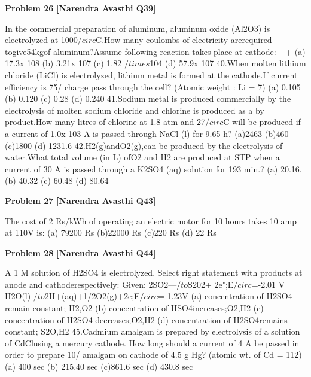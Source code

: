 \begin{problembox}
\textbf{Problem 26} \hfill \textbf{[Narendra Avasthi Q39]}
\label{q:ext-narendra_avasthi_all_questions-26}

In the commercial preparation of aluminum, aluminum oxide (Al2O3) is electrolyzed at
1000$/circ$C.How many coulombs of electricity arerequired togive54kgof aluminum?Assume
following reaction takes place at cathode:
++
(a) 17.3x 108
(b) 3.21x 107
(c) 1.82 $/times$104
(d) 57.9x 107
40.When molten lithium chloride (LiCl) is electrolyzed, lithium metal is formed at the cathode.If
current efficiency is 75/%
charge pass through the cell? (Atomic weight : Li = 7)
(a) 0.105
(b) 0.120
(c) 0.28
(d) 0.240
41.Sodium metal is produced commercially by the electrolysis of molten sodium chloride and
chlorine is produced as a by product.How many litres of chlorine at 1.8 atm and 27$/circ$C will be
produced if a current of 1.0x 103 A is passed through NaCl (l) for 9.65 h?
(a)2463
(b)460
(c)1800
(d) 1231.6
42.H2(g)andO2(g),can be produced by the electrolysis of water.What total volume (in L) ofO2
and H2 are produced at STP when a current of 30 A is passed through a K2SO4 (aq) solution
for 193 min.?
(a) 20.16.
(b) 40.32
(c) 60.48
(d) 80.64
\end{problembox}

\begin{problembox}
\textbf{Problem 27} \hfill \textbf{[Narendra Avasthi Q43]}
\label{q:ext-narendra_avasthi_all_questions-27}

The cost of 2 Rs/kWh of operating an electric motor for 10 hours takes 10 amp at 110V is:
(a) 79200 Rs
(b)22000 Rs
(c)220 Rs
(d) 22 Rs
\end{problembox}

\begin{problembox}
\textbf{Problem 28} \hfill \textbf{[Narendra Avasthi Q44]}
\label{q:ext-narendra_avasthi_all_questions-28}

A 1 M solution of H2SO4 is electrolyzed. Select right statement with products at anode and
cathoderespectively:
Given:
2SO$2$---$/to$S202+ 2e";E$/circ$=-2.01 V
H2O(l)-$/to$2H+(aq)+1/2O2(g)+2e;E$/circ$=-1.23V
(a) concentration of H2SO4 remain constant; H2,O2
(b) concentration of HSO4increases;O2,H2
(c) concentration of H2SO4 decreases;O2,H2
(d) concentration of H2SO4remains constant; S2O,H2
45.Cadmium amalgam is prepared by electrolysis of a solution of CdClusing a mercury cathode.
How long should a current of 4 A be passed in order to prepare 10/%
amalgam on cathode of 4.5 g Hg? (atomic wt. of Cd = 112)
(a) 400 sec
(b) 215.40 sec
(c)861.6 sec
(d) 430.8 sec
\end{problembox}

